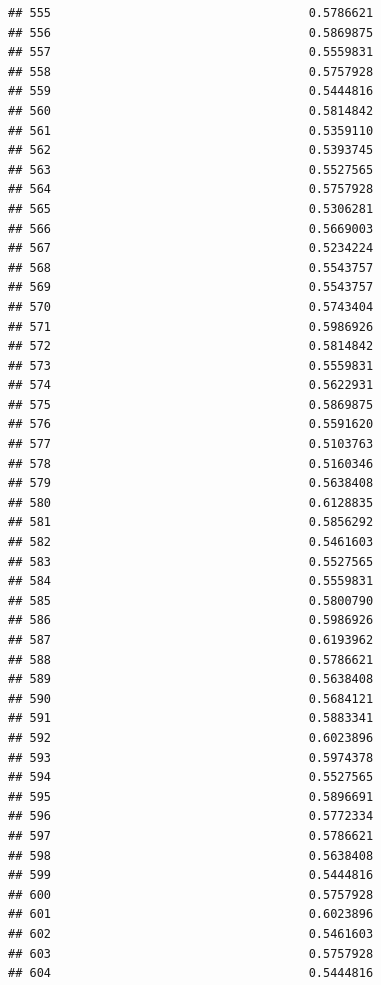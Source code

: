 \documentclass[
  american,
  man,floatsintext]{apa7}
\begin{document}
\begin{verbatim}
## 555                                    0.5786621
## 556                                    0.5869875
## 557                                    0.5559831
## 558                                    0.5757928
## 559                                    0.5444816
## 560                                    0.5814842
## 561                                    0.5359110
## 562                                    0.5393745
## 563                                    0.5527565
## 564                                    0.5757928
## 565                                    0.5306281
## 566                                    0.5669003
## 567                                    0.5234224
## 568                                    0.5543757
## 569                                    0.5543757
## 570                                    0.5743404
## 571                                    0.5986926
## 572                                    0.5814842
## 573                                    0.5559831
## 574                                    0.5622931
## 575                                    0.5869875
## 576                                    0.5591620
## 577                                    0.5103763
## 578                                    0.5160346
## 579                                    0.5638408
## 580                                    0.6128835
## 581                                    0.5856292
## 582                                    0.5461603
## 583                                    0.5527565
## 584                                    0.5559831
## 585                                    0.5800790
## 586                                    0.5986926
## 587                                    0.6193962
## 588                                    0.5786621
## 589                                    0.5638408
## 590                                    0.5684121
## 591                                    0.5883341
## 592                                    0.6023896
## 593                                    0.5974378
## 594                                    0.5527565
## 595                                    0.5896691
## 596                                    0.5772334
## 597                                    0.5786621
## 598                                    0.5638408
## 599                                    0.5444816
## 600                                    0.5757928
## 601                                    0.6023896
## 602                                    0.5461603
## 603                                    0.5757928
## 604                                    0.5444816

\end{verbatim}
\end{document}
